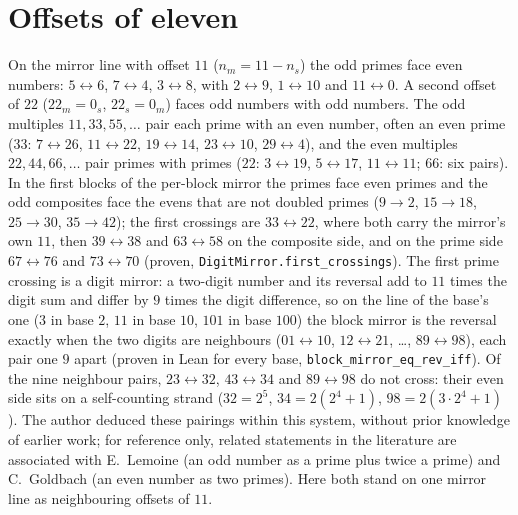 \documentclass[11pt]{article}
\begin{document}
\section{Offsets of eleven}
On the mirror line with offset $11$ ($n_m = 11 - n_s$) the odd primes face even numbers: $5\leftrightarrow6$, $7\leftrightarrow4$, $3\leftrightarrow8$, with $2\leftrightarrow9$, $1\leftrightarrow10$ and $11\leftrightarrow0$. A second offset of $22$ ($22_m = 0_s$, $22_s = 0_m$) faces odd numbers with odd numbers. The odd multiples $11, 33, 55, \dots$ pair each prime with an even number, often an even prime ($33$: $7\leftrightarrow26$, $11\leftrightarrow22$, $19\leftrightarrow14$, $23\leftrightarrow10$, $29\leftrightarrow4$), and the even multiples $22, 44, 66, \dots$ pair primes with primes ($22$: $3\leftrightarrow19$, $5\leftrightarrow17$, $11\leftrightarrow11$; $66$: six pairs). In the first blocks of the per-block mirror the primes face even primes and the odd composites face the evens that are not doubled primes ($9\to2$, $15\to18$, $25\to30$, $35\to42$); the first crossings are $33\leftrightarrow22$, where both carry the mirror's own $11$, then $39\leftrightarrow38$ and $63\leftrightarrow58$ on the composite side, and on the prime side $67\leftrightarrow76$ and $73\leftrightarrow70$ (proven, \texttt{DigitMirror.first\_crossings}). The first prime crossing is a digit mirror: a two-digit number and its reversal add to $11$ times the digit sum and differ by $9$ times the digit difference, so on the line of the base's one ($3$ in base $2$, $11$ in base $10$, $101$ in base $100$) the block mirror is the reversal exactly when the two digits are neighbours ($01\leftrightarrow10$, $12\leftrightarrow21$, \dots, $89\leftrightarrow98$), each pair one $9$ apart (proven in Lean for every base, \texttt{block\_mirror\_eq\_rev\_iff}). Of the nine neighbour pairs, $23\leftrightarrow32$, $43\leftrightarrow34$ and $89\leftrightarrow98$ do not cross: their even side sits on a self-counting strand ($32 = 2^5$, $34 = 2(2^4+1)$, $98 = 2(3\cdot2^4+1)$). The author deduced these pairings within this system, without prior knowledge of earlier work; for reference only, related statements in the literature are associated with E.~Lemoine (an odd number as a prime plus twice a prime) and C.~Goldbach (an even number as two primes). Here both stand on one mirror line as neighbouring offsets of $11$.
\end{document}
